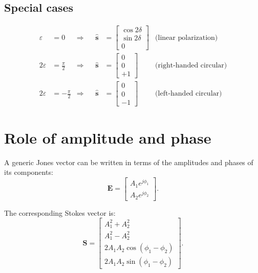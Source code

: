\subsection*{Special cases}
\begin{align}
    \varepsilon &= 0
    &\Rightarrow&
    &\hat{\mathbf{s}} &= 
    \begin{bmatrix}\cos 2\delta\\ \sin 2\delta\\ 0\end{bmatrix} 
    &\text{(linear polarization)}\\[6pt]
    2\varepsilon &= \frac{\pi}{2}
    &\Rightarrow&
    &\hat{\mathbf{s}} &= 
    \begin{bmatrix}0\\ 0\\ +1\end{bmatrix}
    &\text{(right-handed circular)}\\[6pt]
    2\varepsilon &= -\frac{\pi}{2}
    &\Rightarrow&
    &\hat{\mathbf{s}} &= 
    \begin{bmatrix}0\\ 0\\ -1\end{bmatrix}
    &\text{(left-handed circular)}
\end{align}

\section{Role of amplitude and phase}

A generic Jones vector can be written in terms of the amplitudes and phases of its components:
\begin{equation}
    \mathbf{E} =
    \begin{bmatrix}
        A_1 e^{j\phi_1}\\[4pt]
        A_2 e^{j\phi_2}
    \end{bmatrix}.
\end{equation}

The corresponding Stokes vector is:
\begin{equation}
    \mathbf{S} =
    \begin{bmatrix}
        A_1^2 + A_2^2\\[4pt]
        A_1^2 - A_2^2\\[4pt]
        2A_1A_2\cos(\phi_1 - \phi_2)\\[4pt]
        2A_1A_2\sin(\phi_1 - \phi_2)
    \end{bmatrix}.
\end{equation}

